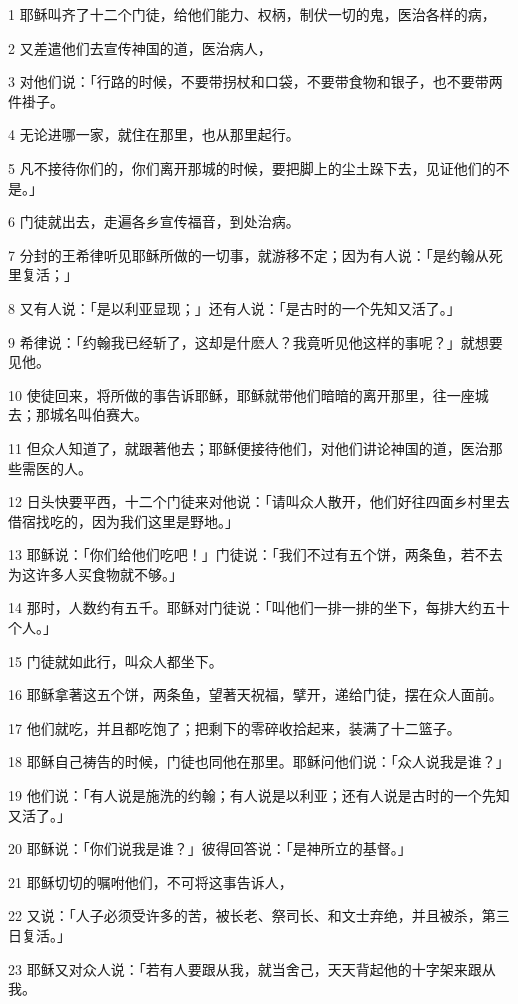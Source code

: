 \par 1 耶稣叫齐了十二个门徒，给他们能力、权柄，制伏一切的鬼，医治各样的病，
\par 2 又差遣他们去宣传神国的道，医治病人，
\par 3 对他们说：「行路的时候，不要带拐杖和口袋，不要带食物和银子，也不要带两件褂子。
\par 4 无论进哪一家，就住在那里，也从那里起行。
\par 5 凡不接待你们的，你们离开那城的时候，要把脚上的尘土跺下去，见证他们的不是。」
\par 6 门徒就出去，走遍各乡宣传福音，到处治病。
\par 7 分封的王希律听见耶稣所做的一切事，就游移不定；因为有人说：「是约翰从死里复活；」
\par 8 又有人说：「是以利亚显现；」还有人说：「是古时的一个先知又活了。」
\par 9 希律说：「约翰我已经斩了，这却是什麽人？我竟听见他这样的事呢？」就想要见他。
\par 10 使徒回来，将所做的事告诉耶稣，耶稣就带他们暗暗的离开那里，往一座城去；那城名叫伯赛大。
\par 11 但众人知道了，就跟著他去；耶稣便接待他们，对他们讲论神国的道，医治那些需医的人。
\par 12 日头快要平西，十二个门徒来对他说：「请叫众人散开，他们好往四面乡村里去借宿找吃的，因为我们这里是野地。」
\par 13 耶稣说：「你们给他们吃吧！」门徒说：「我们不过有五个饼，两条鱼，若不去为这许多人买食物就不够。」
\par 14 那时，人数约有五千。耶稣对门徒说：「叫他们一排一排的坐下，每排大约五十个人。」
\par 15 门徒就如此行，叫众人都坐下。
\par 16 耶稣拿著这五个饼，两条鱼，望著天祝福，擘开，递给门徒，摆在众人面前。
\par 17 他们就吃，并且都吃饱了；把剩下的零碎收拾起来，装满了十二篮子。
\par 18 耶稣自己祷告的时候，门徒也同他在那里。耶稣问他们说：「众人说我是谁？」
\par 19 他们说：「有人说是施洗的约翰；有人说是以利亚；还有人说是古时的一个先知又活了。」
\par 20 耶稣说：「你们说我是谁？」彼得回答说：「是神所立的基督。」
\par 21 耶稣切切的嘱咐他们，不可将这事告诉人，
\par 22 又说：「人子必须受许多的苦，被长老、祭司长、和文士弃绝，并且被杀，第三日复活。」
\par 23 耶稣又对众人说：「若有人要跟从我，就当舍己，天天背起他的十字架来跟从我。

